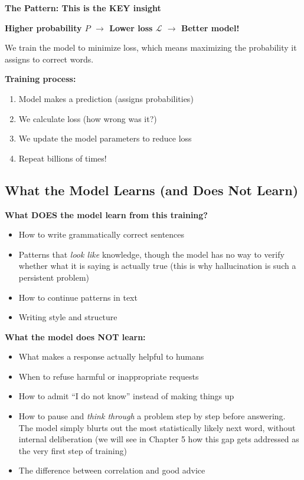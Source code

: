 \begin{chapterenv}
\begin{infobox}
\textbf{The Pattern: This is the KEY insight}

\textbf{Higher probability $P$ $\rightarrow$ Lower loss $\mathcal{L}$ $\rightarrow$ Better model!}

We train the model to minimize loss, which means maximizing the probability it assigns to correct words.

\textbf{Training process:}
\begin{enumerate}[nosep]
    \item Model makes a prediction (assigns probabilities)
    \item We calculate loss (how wrong was it?)
    \item We update the model parameters to reduce loss
    \item Repeat billions of times!
\end{enumerate}
\end{infobox}

\subsection{What the Model Learns (and Does Not Learn)}

\textbf{What DOES the model learn from this training?}

\begin{itemize}[nosep]
    \item How to write grammatically correct sentences
    \item Patterns that \textit{look like} knowledge, though the model has no way to verify whether what it is saying is actually true (this is why hallucination is such a persistent problem)
    \item How to continue patterns in text
    \item Writing style and structure
\end{itemize}

\textbf{What the model does NOT learn:}

\begin{itemize}[nosep]
    \item What makes a response actually helpful to humans
    \item When to refuse harmful or inappropriate requests
    \item How to admit ``I do not know'' instead of making things up
    \item How to pause and \textit{think through} a problem step by step before answering. The model simply blurts out the most statistically likely next word, without internal deliberation (we will see in Chapter 5 how this gap gets addressed as the very first step of training)
    \item The difference between correlation and good advice
\end{itemize}


\end{chapterenv}
